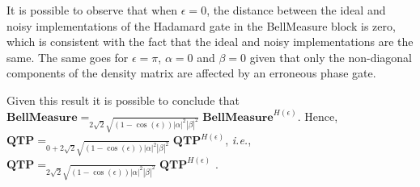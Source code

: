   It is possible to observe that when $\epsilon = 0$, the distance between the ideal and noisy implementations of the Hadamard gate in the BellMeasure block is zero, which is consistent with the fact that the ideal and noisy implementations are the same. The same goes for $\epsilon = \pi$, $\alpha= 0$ and  $\beta= 0$ given that only the non-diagonal components of the density matrix are affected by an erroneous phase gate.
  
  Given this result it is possible to conclude that $\textbf{BellMeasure}=_{ 2\sqrt{2} \sqrt{(1-\cos(\epsilon))|\alpha|^{2}|\beta|^{2}}}\textbf{BellMeasure}^{H(\epsilon)}$. Hence, $\textbf{QTP}=_{0+2\sqrt{2} \sqrt{(1-\cos(\epsilon))|\alpha|^{2}|\beta|^{2}}}\textbf{QTP}^{H(\epsilon)}$, \textit{i.e.}, $\textbf{QTP}=_{2\sqrt{2} \sqrt{(1-\cos(\epsilon))|\alpha|^{2}|\beta|^{2}}}\textbf{QTP}^{H(\epsilon)}$ .




